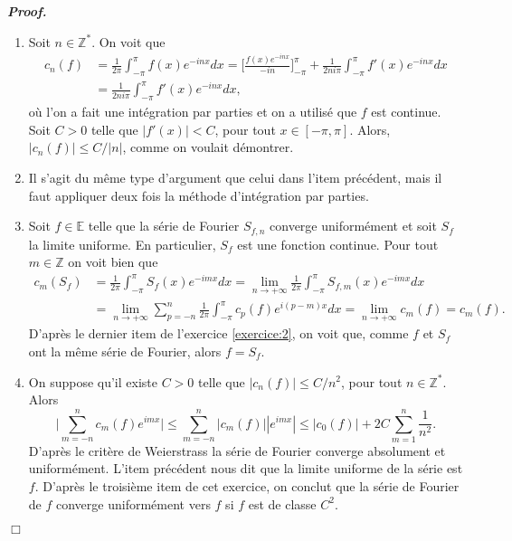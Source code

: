\documentclass[11pt,a4paper]{article}
\newenvironment{preuve}[1][]
{\vskip 2mm  \noindent\emph{\bf Proof#1. }}{$\Box$ \vskip 2mm}
\let\leq\leqslant
\newcommand{\Z}{\mathbb{Z}}
\newcounter{exercice}
\begin{document}
	\begin{preuve}
		\begin{enumerate} 
			\item Soit $n \in \Z^{*}$. 
			On voit que 
			\begin{align*} 
			c_{n}(f) &= \frac{1}{2\pi} \int_{-\pi}^{\pi} f(x) e^{-inx} dx = \bigg[ \frac{f(x)e^{-inx}}{-in} \bigg]_{-\pi}^{\pi} + \frac{1}{2 n i \pi} \int_{-\pi}^{\pi} f'(x) e^{-inx} dx 
			\\
			&= \frac{1}{2 n i \pi} \int_{-\pi}^{\pi} f'(x) e^{-inx} dx,     
			\end{align*}
			où l'on a fait une intégration par parties et on a utilisé que $f$ est continue. 
			Soit $C > 0$ telle que $|f'(x)| < C$, pour tout $x \in [-\pi , \pi]$. 
			Alors, $|c_{n}(f)| \leq C/|n|$, comme on voulait démontrer. 
			\item Il s'agit du même type d'argument que celui dans l'item précédent, mais il faut appliquer deux fois la méthode d'intégration par parties.  
			\item Soit $f \in \mathbb{E}$ telle que la série de Fourier $S_{f,n}$ converge uniformément et soit $S_{f}$ la limite uniforme. 
			En particulier, $S_{f}$ est une fonction continue. 
			Pour tout $m \in \Z$ on voit bien que 
			\begin{align*}   
			c_{m}(S_{f}) &= \frac{1}{2\pi} \int_{-\pi}^{\pi} S_{f}(x) e^{-imx} dx = \underset{n \rightarrow + \infty} {\lim} \frac{1}{2\pi} \int_{-\pi}^{\pi} S_{f,m}(x) e^{-imx} dx 
			\\  
			&= \underset{n \rightarrow + \infty} {\lim} \sum_{p=-n}^{n} \frac{1}{2\pi} \int_{-\pi}^{\pi} c_{p}(f) e^{i(p-m)x} dx 
			= \underset{n \rightarrow + \infty} {\lim} c_{m}(f) = c_{m}(f).
			\end{align*}
			D'après le dernier item de l'exercice \ref{exercice:2}, on voit que, comme $f$ et $S_{f}$ ont la même série de Fourier, alors 
			$f = S_{f}$.
			
			\item On suppose qu'il existe $C > 0$ telle que $|c_{n}(f)| \leq C/n^{2}$, pour tout $n \in \Z^{*}$. 
			Alors 
			\[     \bigg| \sum_{m=-n}^{n} c_{m}(f) e^{imx} \bigg| \leq \sum_{m=-n}^{n} |c_{m}(f)| |e^{imx}| \leq |c_{0}(f)| + 2 C \sum_{m=1}^{n} \frac{1}{n^{2}}.     \]
			D'après le critère de Weierstrass la série de Fourier converge absolument et uniformément. 
			L'item précédent nous dit que la limite uniforme de la série est $f$. 
			D'après le troisième item de cet exercice, on conclut que la série de Fourier de $f$ converge uniformément vers $f$ si $f$ est de classe $C^{2}$. 
		\end{enumerate} 
	\end{preuve}
	
\end{document}
